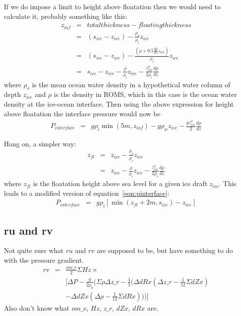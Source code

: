\documentclass[12pt]{article}
\begin{document}
If we do impose a limit to height above floatation then we would need to calculate it, probably something like this: 
\begin{eqnarray}
\nonumber z_{iaf} & = & total thickness - floating thickness \\
\nonumber         & = & (s_{ice} - z_{ice}) - \frac{\rho_o}{\rho_i} z_{ice} \\
\nonumber         & = & (s_{ice} - z_{ice}) - \frac{(\rho+0.5\frac{d\rho}{dz}z_{ice})}{\rho_i} z_{ice} \\
        & = & s_{ice} - z_{ice} - \frac{\rho}{\rho_i}z_{ice} - \frac{z_{ice}^2}{2 \rho_i}\frac{d\rho}{dz} 
\end{eqnarray}
where $\rho_o$ is the mean ocean water density in a hypothetical water column of depth $z_{ice}$ and 
$\rho$ is the density in ROMS, which in this case is the ocean water density at the ice-ocean interface. 
Then using the above expression for height above floatation the interface pressure would now be
\begin{eqnarray}
\nonumber P_{interface} & = &  {g \rho_i \min({5m,z_{iaf}})} - {g \rho_w z_{ice}} - \frac{g z_{ice}^2}{2} \frac{d\rho}{dz} 
\end{eqnarray}

Hang on, a simpler way:
\begin{eqnarray}
\nonumber z_{fl}  & = &  z_{ice} - \frac{\rho_o}{\rho_i} z_{ice}  \\
\nonumber         & = &  z_{ice} - \frac{\rho}{\rho_i}z_{ice} - \frac{z_{ice}^2}{2 \rho_i}\frac{d\rho}{dz} 
\end{eqnarray}
where $z_{fl}$ is the floatation height above sea level for a given ice draft $z_{ice}$.
This leads to a modified version of equation~\ref{eqn:pinterface}:
\begin{eqnarray}
P_{interface} & = & g \rho_i \left[ \min \left({z_{fl} + 2m,s_{ice}} \right)  - z_{ice} \right]
\end{eqnarray}




\subsection{ru and rv}

Not quite sure what $ru$ and $rv$ are supposed to be, but have something to do with the pressure gradient.
\begin{eqnarray}
\nonumber rv & = & \frac{om\_v}{2}  \Sigma Hz \times \\
\nonumber && \Big[\Delta P - \frac{g}{2 \rho_0}  \Big(\Sigma \rho \Delta z\_r - \frac{1}{5} ( \Delta dRx (\Delta z\_r - \frac{1}{12} \Sigma dZx) \\
          && - \Delta dZx (\Delta \rho - \frac{1}{12}  \Sigma dRx))\Big)\Big]
\end{eqnarray}
Also don't know what $om\_v$, $Hz$, $z\_r$, $dZx$, $dRx$ are. 
\end{document}
